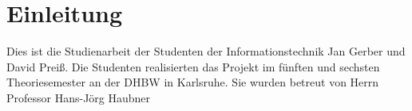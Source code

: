\chapter{Einleitung}
Dies ist die Studienarbeit der Studenten der Informationstechnik Jan Gerber und David Preiß. Die Studenten realisierten das Projekt im fünften und sechsten Theoriesemester an der DHBW in Karlsruhe. Sie wurden betreut von Herrn Professor Hans-Jörg Haubner




